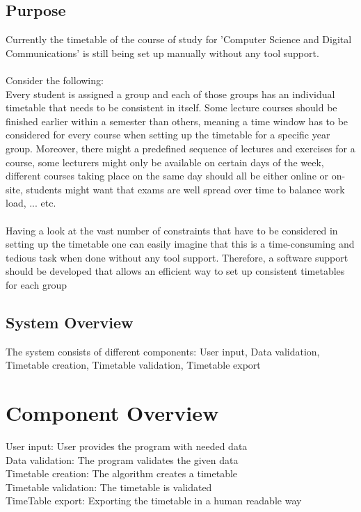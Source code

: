 \documentclass{scrreprt}
\begin{document}
	\section{Purpose}
	Currently the timetable of the course of study for 'Computer Science and Digital Communications' is still being set up manually without any tool support.\\\\
	Consider the following:\\
	Every student is assigned a group and each of those groups has an individual timetable that needs to be consistent in itself. Some lecture courses should be finished earlier	within a semester than others, meaning a time window has to be considered for every course when setting up the timetable for a specific year group. Moreover, there might a predefined sequence of lectures and exercises for a course, some lecturers might only be available on certain days of the week, different courses taking	place on the same day should all be either online or on-site, students might want that exams are well spread over time to balance work load, ... etc.\\\\
	Having a look at the vast number of constraints that have to be considered in setting up the timetable one can easily imagine that this is a time-consuming and tedious task when done without any tool support. Therefore, a software support should be developed that allows an efficient way to set up consistent timetables for each group


	
	\section{System Overview}
	The system consists of different components: User input, Data validation, Timetable creation, Timetable validation, Timetable export
	\chapter{Component Overview}
	User input: User provides the program with needed data\\
	Data validation: The program validates the given data\\
	Timetable creation: The algorithm creates a timetable\\
	Timetable validation: The timetable is validated\\
	TimeTable export: Exporting the timetable in a human readable way\\
	
\end{document}
